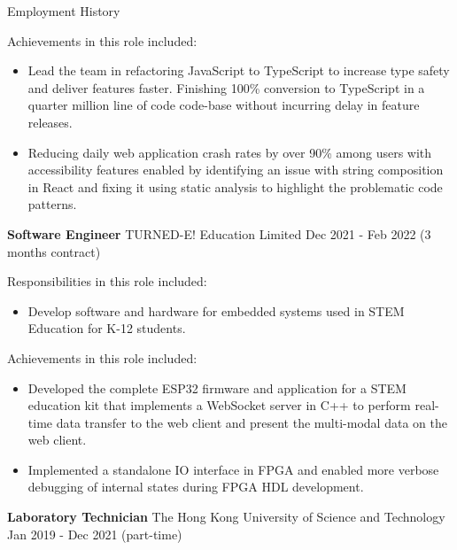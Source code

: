 \documentclass{resume} %
\begin{document}
\begin{rSection}{Employment History}
\begin{minipage}{.8\textwidth}
        Achievements in this role included:
        \begin{itemize}
            \item Lead the team in refactoring JavaScript to TypeScript to increase type safety and deliver features faster. Finishing 100\% conversion to TypeScript in a quarter million line of code code-base without incurring delay in feature releases.
            \item Reducing daily web application crash rates by over 90\% among users with accessibility features enabled by identifying an issue with string composition in React and fixing it using static analysis to highlight the problematic code patterns.
        \end{itemize}
    \end{minipage}%
    
    \item \textbf{Software Engineer} {TURNED-E! Education Limited} \hfill Dec 2021 - Feb 2022 (3 months contract) \\
    
    \hspace*{1cm}%
    \begin{minipage}{.8\textwidth}%
        
        Responsibilities in this role included:
        \begin{itemize}
            \item Develop software and hardware for embedded systems used in STEM Education for K-12 students.
        \end{itemize}
        
        Achievements in this role included:
        \begin{itemize}
            \item Developed the complete ESP32 firmware and application for a STEM education kit that implements a WebSocket server in C++ to perform real-time data transfer to the web client and present the multi-modal data on the web client.
            \item Implemented a standalone IO interface in FPGA and enabled more verbose debugging of internal states during FPGA HDL development.
        \end{itemize}
    \end{minipage}%
    
    
    \item \textbf{Laboratory Technician} {The Hong Kong University of Science and Technology} \hfill Jan 2019 - Dec 2021 (part-time) \\
    

\end{rSection}
\end{document}
